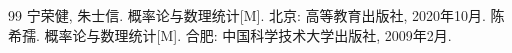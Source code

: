 \cleardoublepage
{}
{}
\begin{thebibliography}{99}
     宁荣健, 朱士信. 概率论与数理统计[M]. 北京: 高等教育出版社, 2020年10月.
     陈希孺. 概率论与数理统计[M]. 合肥: 中国科学技术大学出版社, 2009年2月.
\end{thebibliography}





